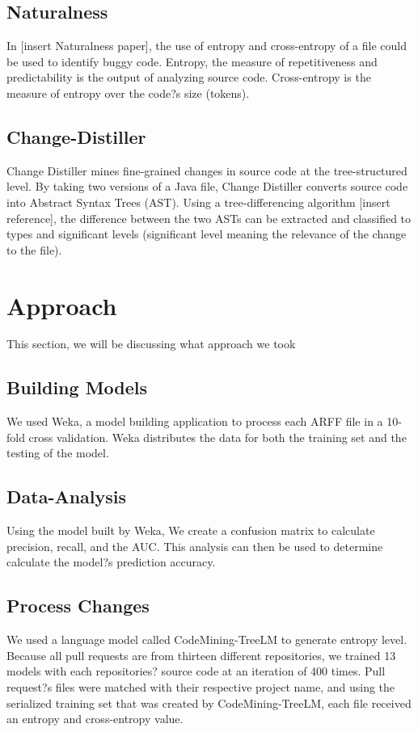 \documentclass[10pt, conference]{IEEEtran}
\begin{document}
\subsection{Naturalness}
In [insert Naturalness paper], the use of entropy and cross-entropy of a file could be used to identify buggy code. Entropy, the measure of repetitiveness and predictability is the output of analyzing source code. Cross-entropy is the measure of entropy over the code?s size (tokens).

\subsection{Change-Distiller}
Change Distiller mines fine-grained changes in source code at the tree-structured level. By taking two versions of a Java file, Change Distiller converts source code into Abstract Syntax Trees (AST). Using a tree-differencing algorithm [insert reference], the difference between the two ASTs can be extracted and classified to types and significant levels (significant level meaning the relevance of the change to the file). 

\section{Approach}
This section, we will be discussing what approach we took

\subsection{Building Models}
We used Weka, a model building application to process each ARFF file in a 10-fold cross validation. Weka distributes the data for both the training set and the testing of the model.

\subsection{Data-Analysis}
Using the model built by Weka, We create a confusion matrix to calculate precision, recall, and the AUC. This analysis can then be used to determine calculate the model?s prediction accuracy.

\subsection{Process Changes}
We used a language model called CodeMining-TreeLM to generate entropy level. Because all pull requests are from thirteen different repositories, we trained 13 models with each repositories? source code at an iteration of 400 times. Pull request?s files were matched with their respective project name, and using the serialized training set that was created by CodeMining-TreeLM, each file received an entropy and cross-entropy value.
\end{document}
